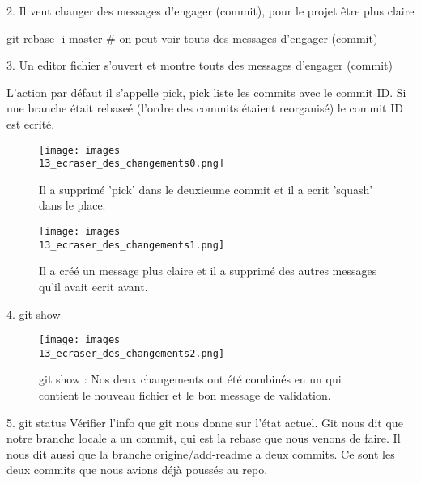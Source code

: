 \documentclass[11pt, onecolumn]{article}
\begin{document}
2. Il veut changer des messages d'engager (commit), pour le projet être plus claire

git rebase -i master   # on peut voir touts des messages d'engager (commit)

3. Un editor fichier s'ouvert et montre touts des messages d'engager (commit) 


L'action par défaut il s'appelle pick, pick liste les commits avec le commit ID. Si une branche était rebaseé (l'ordre des commits étaient reorganisé) le commit ID est ecrité.


\begin{figure}[h]
\begin{center}
\texttt{[image: images\\13\_ecraser\_des\_changements0.png]}
\end{center}
\caption{Il a supprimé 'pick' dans le deuxieume commit et il a ecrit 'squash' dans le place.}
\label{13_ecraser_des_changements0}
\end{figure}

\begin{figure}[h]
\begin{center}
\texttt{[image: images\\13\_ecraser\_des\_changements1.png]}
\end{center}
\caption{Il a créé un message plus claire et il a supprimé des autres messages qu'il avait ecrit avant.}
\label{13_ecraser_des_changements1}
\end{figure}

4. git show

\begin{figure}[h]
\begin{center}
\texttt{[image: images\\13\_ecraser\_des\_changements2.png]}
\end{center}
\caption{git show : Nos deux changements ont été combinés en un qui contient le nouveau fichier et le bon message de validation.}
\label{13_ecraser_des_changements2}
\end{figure}

5. git status
Vérifier l'info que git nous donne sur l'état actuel. Git nous dit que notre branche locale a un commit, qui est la rebase que nous venons de faire. Il nous dit aussi que la branche origine/add-readme a deux commits. Ce sont les deux commits que nous avions déjà poussés au repo. 
\end{document}
